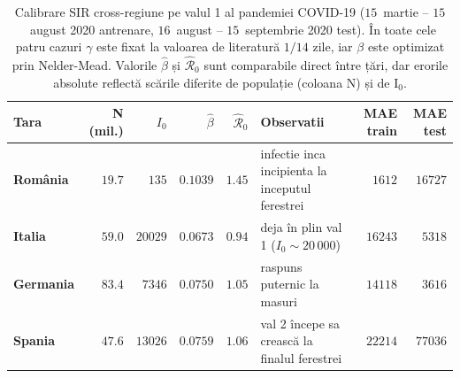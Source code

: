 \begin{table}[!htbp]
\centering
\caption[Calibrare SIR multi-regiune]{Calibrare SIR cross-regiune pe valul 1 al pandemiei COVID-19 ($15$~martie -- $15$~august 2020 antrenare, $16$~august -- $15$~septembrie 2020 test). În toate cele patru cazuri $\gamma$ este fixat la valoarea de literatură $1/14$ zile, iar $\beta$ este optimizat prin Nelder-Mead. Valorile $\hat\beta$ și $\hat{\mathcal{R}}_0$ sunt comparabile direct între țări, dar erorile absolute reflectă scările diferite de populație (coloana N) și de I$_0$.}
\label{tab:calibration_multiregion}
\begin{tabularx}{\textwidth}{l r r r r X r r}
\toprule
\textbf{Tara} & \textbf{N (mil.)} & \textbf{$I_0$} & \textbf{$\hat\beta$} & \textbf{$\hat{\mathcal{R}}_0$} & \textbf{Observatii} & \textbf{MAE train} & \textbf{MAE test} \\
\midrule
\textbf{România} & $19.7$ & $135$ & $0.1039$ & $1.45$ & infectie inca incipienta la inceputul ferestrei & $1612$ & $16727$ \\
\textbf{Italia} & $59.0$ & $20029$ & $0.0673$ & $0.94$ & deja în plin val 1 ($I_0 \sim 20\,000$) & $16243$ & $5318$ \\
\textbf{Germania} & $83.4$ & $7346$ & $0.0750$ & $1.05$ & raspuns puternic la masuri & $14118$ & $3616$ \\
\textbf{Spania} & $47.6$ & $13026$ & $0.0759$ & $1.06$ & val 2 începe sa crească la finalul ferestrei & $22214$ & $77036$ \\
\bottomrule
\end{tabularx}
\end{table}
